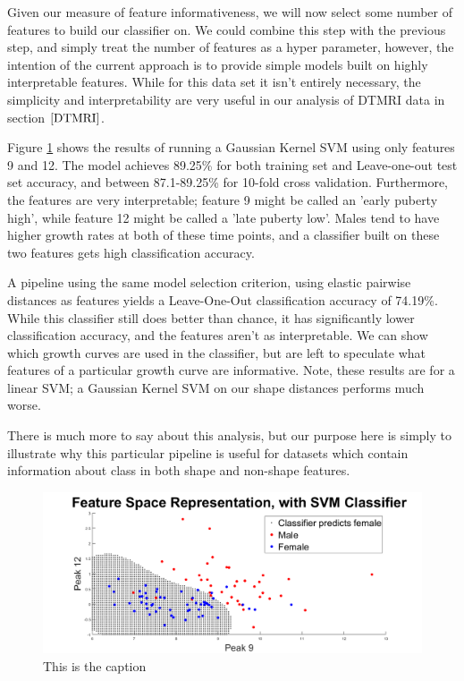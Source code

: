 \documentclass[]{article}
\begin{document}
Given our measure of feature informativeness, we will now select some number of features to build our classifier on. We could combine this step with the previous step, and simply treat the number of features as a hyper parameter, however, the intention of the current approach is to provide simple models built on highly interpretable features. While for this data set it isn't entirely necessary, the simplicity and interpretability are very useful in our analysis of DTMRI data in section $\ref{DTMRI}$.  

Figure \ref{EX1: classifier plot} shows the results of running a Gaussian Kernel SVM using only features 9 and 12. The model achieves 89.25\% for both training set and Leave-one-out test set accuracy, and between 87.1-89.25\% for 10-fold cross validation. Furthermore, the features are very interpretable; feature 9 might be called an 'early puberty high', while feature 12 might be called a 'late puberty low'. Males tend to have higher growth rates at both of these time points, and a classifier built on these two features gets high classification accuracy. 

A pipeline using the same model selection criterion, using elastic pairwise distances as features yields a Leave-One-Out classification accuracy of 74.19\%. While this classifier still does better than chance, it has significantly lower classification accuracy, and the features aren't as interpretable. We can show which growth curves are used in the classifier, but are left to speculate what features of a particular growth curve are informative. Note, these results are for a linear SVM; a Gaussian Kernel SVM on our shape distances performs much worse. 

There is much more to say about this analysis, but our purpose here is simply to illustrate why this particular pipeline is useful for datasets which contain information about class in both shape and non-shape features.


\begin{center}
	\begin{figure}
		\includegraphics[width = \linewidth]{./Feature Space.png}
		\caption{This is the caption}
		\label{EX1: classifier plot}
	\end{figure}
\end{center}
\end{document}
